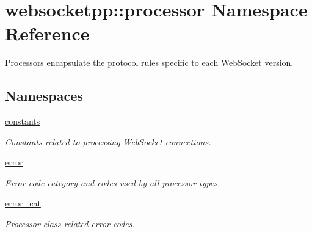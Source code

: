 \hypertarget{namespacewebsocketpp_1_1processor}{}\section{websocketpp\+:\+:processor Namespace Reference}
\label{namespacewebsocketpp_1_1processor}


Processors encapsulate the protocol rules specific to each Web\+Socket version.  


\subsection*{Namespaces}
\begin{DoxyCompactItemize}
\item 
 \mbox{\hyperlink{namespacewebsocketpp_1_1processor_1_1constants}{constants}}
\begin{DoxyCompactList}\small\item\em Constants related to processing Web\+Socket connections. \end{DoxyCompactList}\item 
 \mbox{\hyperlink{namespacewebsocketpp_1_1processor_1_1error}{error}}
\begin{DoxyCompactList}\small\item\em Error code category and codes used by all processor types. \end{DoxyCompactList}\item 
 \mbox{\hyperlink{namespacewebsocketpp_1_1processor_1_1error__cat}{error\+\_\+cat}}
\begin{DoxyCompactList}\small\item\em Processor class related error codes. \end{DoxyCompactList}\end{DoxyCompactItemize}
